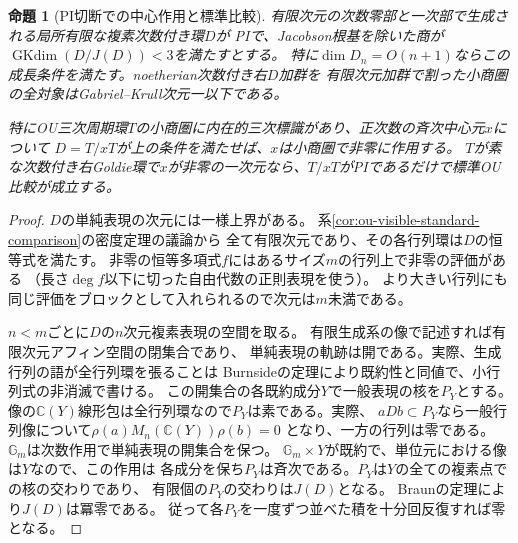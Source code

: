 \documentclass[11pt,a4paper]{ltjsarticle}
\newtheorem{proposition}[theorem]{命題}
\theoremstyle{definition}
\begin{document}
\begin{proposition}[PI切断での中心作用と標準比較]
\label{prop:ou-small-pi-quotient}
有限次元の次数零部と一次部で生成される局所有限な複素次数付き環$D$が
PIで、Jacobson根基を除いた商が$\operatorname{GKdim}(D/J(D))<3$を満たすとする。
特に$\dim D_n=O(n+1)$ならこの成長条件を満たす。noetherian次数付き右$D$加群を
有限次元加群で割った小商圏の全対象はGabriel--Krull次元一以下である。

特にOU三次周期環$T$の小商圏に内在的三次標識があり、正次数の斉次中心元$x$について
$D=T/xT$が上の条件を満たせば、$x$は小商圏で非零に作用する。
$T$が素な次数付き右Goldie環で$x$が非零の一次元なら、$T/xT$がPIであるだけで標準OU比較が成立する。
\end{proposition}
\begin{proof}
$D$の単純表現の次元には一様上界がある。
系\ref{cor:ou-visible-standard-comparison}の密度定理の議論から
全て有限次元であり、その各行列環は$D$の恒等式を満たす。
非零の恒等多項式$f$にはあるサイズ$m$の行列上で非零の評価がある
（長さ$\deg f$以下に切った自由代数の正則表現を使う）。
より大きい行列にも同じ評価をブロックとして入れられるので次元は$m$未満である。

$n<m$ごとに$D$の$n$次元複素表現の空間を取る。
有限生成系の像で記述すれば有限次元アフィン空間の閉集合であり、
単純表現の軌跡は開である。実際、生成行列の語が全行列環を張ることは
Burnsideの定理により既約性と同値で、小行列式の非消滅で書ける。
この開集合の各既約成分$Y$で一般表現の核を$P_Y$とする。
像の$\mathbb C(Y)$線形包は全行列環なので$P_Y$は素である。実際、
$aDb\subset P_Y$なら一般行列像について$\rho(a)M_n(\mathbb C(Y))\rho(b)=0$
となり、一方の行列は零である。
$\mathbb G_m$は次数作用で単純表現の開集合を保つ。
$\mathbb G_m\times Y$が既約で、単位元における像は$Y$なので、この作用は
各成分を保ち$P_Y$は斉次である。$P_Y$は$Y$の全ての複素点での核の交わりであり、
有限個の$P_Y$の交わりは$J(D)$となる。
Braunの定理\cite{Braun1984}により$J(D)$は冪零である。
従って各$P_Y$を一度ずつ並べた積を十分回反復すれば零となる。


\end{proof}
\end{document}
